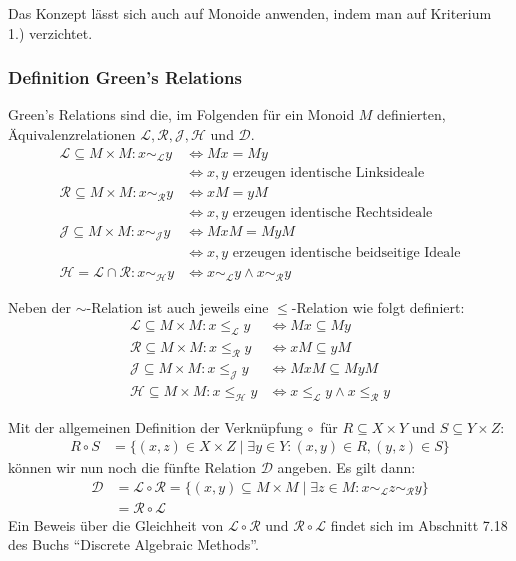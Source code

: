 \documentclass[12pt, german]{article}
\newcommand{\grel}{\sim_{\mathcal{L}}}
\newcommand{\grer}{\sim_{\mathcal{R}}}
\newcommand{\grej}{\sim_{\mathcal{J}}}
\newcommand{\greh}{\sim_{\mathcal{H}}}
\newcommand{\lgreleq}{\leqslant_{\mathcal{L}}}
\newcommand{\lgrereq}{\leqslant_{\mathcal{R}}}
\newcommand{\lgrejeq}{\leqslant_{\mathcal{J}}}
\newcommand{\lgreheq}{\leqslant_{\mathcal{H}}}
\begin{document}
	Das Konzept lässt sich auch auf Monoide anwenden, indem man auf Kriterium 1.) verzichtet.
	\subsubsection{Definition Green's Relations}	
	Green's Relations sind die, im Folgenden für ein Monoid $M$ definierten, Äquivalenzrelationen $\mathcal{L,R, J, H}$ und $\mathcal{D}$. 
	\begin{align*}
		\mathcal L \subseteq M \times M: x \grel y &\iff Mx = My \\ 
		&\iff x,y \text{ erzeugen identische Linksideale} \\
		\mathcal R \subseteq M \times M: x \grer y &\iff xM = yM  \\ 
		&\iff x,y \text{ erzeugen identische Rechtsideale} \\
		\mathcal J \subseteq M \times M: x \grej y &\iff MxM = MyM \\ 
		&\iff x,y \text{ erzeugen identische beidseitige Ideale} \\
		\mathcal H = \mathcal L \cap \mathcal R: x \greh y &\iff x \grel y \wedge x \grer y
	\end{align*}
	\newline
	
	Neben der $\sim$-Relation ist auch jeweils eine $\leq$-Relation wie folgt definiert:
	\begin{align*}
		\mathcal L \subseteq M \times M: x \lgreleq y &\iff Mx \subseteq My \\
		\mathcal R \subseteq M \times M: x \lgrereq y &\iff xM \subseteq yM \\
		\mathcal J \subseteq M \times M: x \lgrejeq y &\iff MxM \subseteq MyM  \\
		\mathcal H \subseteq M \times M: x \lgreheq y &\iff x \lgreleq y \land x \lgrereq y 
	\end{align*}
	\newline
	
	Mit der allgemeinen Definition der Verknüpfung $\circ \,$ für $R \subseteq X \times Y$ und $S \subseteq Y \times Z$:
	\begin{align*}
		R \circ S &= \{(x,z) \in X \times Z \mid \exists y \in Y: (x,y) \in R, (y, z) \in S\} 
	\end{align*}
	können wir nun noch die fünfte Relation $\mathcal{D}$ angeben.  
	Es gilt dann: 
	\begin{align*}
		\mathcal{D}&=\mathcal L \circ \mathcal R = \{ (x,y) \subseteq M \times M \mid \exists z \in M : x \grel z \grer y \}\\
		&=\mathcal R \circ \mathcal L
	\end{align*}
	Ein Beweis über die Gleichheit von $\mathcal L \circ \mathcal R$ und $\mathcal R \circ \mathcal L$ findet sich im Abschnitt 7.18 des Buchs ``Discrete Algebraic Methods''.
	 
\end{document}
